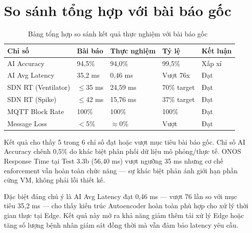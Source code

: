\section{So sánh tổng hợp với bài báo gốc}

\begin{table}[htbp]
\caption{Bảng tổng hợp so sánh kết quả thực nghiệm với bài báo gốc~\cite{paper_main}}
\label{tab:comparison}
\centering
\begin{tabular}{lllll}
\toprule
\textbf{Chỉ số} & \textbf{Bài báo} & \textbf{Thực nghiệm} & \textbf{Tỷ lệ} & \textbf{Kết luận} \\
\midrule
AI Accuracy         & 94,5\%    & 94,0\%    & 99,5\%    & Xấp xỉ \\
AI Avg Latency      & 35,2 ms   & 0,46 ms   & Vượt 76x  & Đạt \\
SDN RT (Ventilator) & $\leq$35 ms & 24,59 ms & 70\% target & Đạt \\
SDN RT (Spike)      & $\leq$42 ms & 15,76 ms & 37\% target & Đạt \\
MQTT Block Rate     & 100\%     & 100\%     & 100\%     & Đạt \\
Message Loss        & $<$5\%    & $\approx$0\% & Vượt  & Đạt \\
\bottomrule
\end{tabular}
\end{table}

Kết quả cho thấy 5 trong 6 chỉ số đạt hoặc vượt mục tiêu bài báo gốc. Chỉ số AI Accuracy chênh 0,5\% do khác biệt phân phối dữ liệu mô phỏng/thực tế. ONOS Response Time tại Test 3.3b (56,40 ms) vượt ngưỡng 35 ms nhưng cơ chế enforcement vẫn hoàn toàn chức năng — sự khác biệt phản ánh giới hạn phần cứng VM, không phải lỗi thiết kế.

Đặc biệt đáng chú ý là AI Avg Latency đạt 0,46 ms — vượt 76 lần so với mục tiêu 35,2 ms — cho thấy kiến trúc Autoencoder hoàn toàn phù hợp cho xử lý thời gian thực tại Edge. Kết quả này mở ra khả năng giảm thêm tải xử lý Edge hoặc tăng số lượng bệnh nhân giám sát đồng thời mà vẫn đảm bảo latency yêu cầu.
